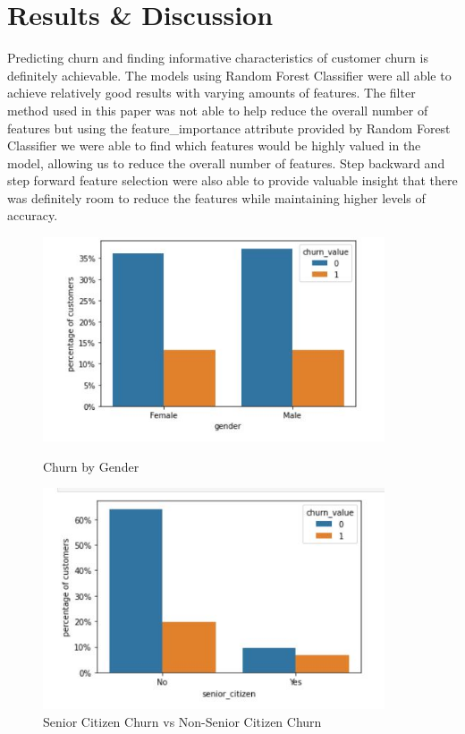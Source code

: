 \documentclass[12pt, a4paper]{article}
\begin{document}
\section{Results \& Discussion}
Predicting churn and finding informative characteristics of customer churn is definitely achievable. The models using Random Forest Classifier were all able to achieve relatively good results with varying amounts of features. The filter method used in this paper was not able to help reduce the overall number of features but using the feature\_importance attribute provided by Random Forest Classifier we were able to find which features would be highly valued in the model, allowing us to reduce the overall number of features. Step backward and step forward feature selection were also able to provide valuable insight that there was definitely room to reduce the features while maintaining higher levels of accuracy.
\begin{figure}
    \centering
    \begin{minipage}{0.45\textwidth}
        \centering
        \includegraphics[width=0.9\textwidth]{photos/genderChurnBarChart.JPG}
        \caption{Churn by Gender}
    \end{minipage}\hfill
    \begin{minipage}{0.45\textwidth}
        \centering
        \includegraphics[width=0.9\textwidth]{photos/seniorCitizenVsNonSeniorCitizenBarChart.JPG}
        \caption{Senior Citizen Churn vs Non-Senior Citizen Churn}
    \end{minipage}
\end{figure}
\end{document}
